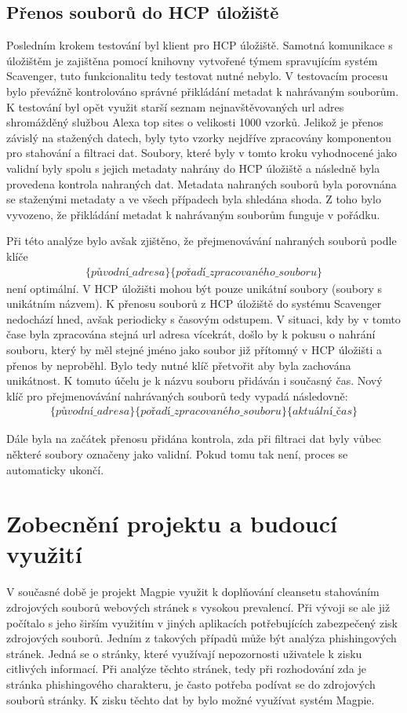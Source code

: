 \documentclass[thesis=M,czech,hidelinks]{FITthesis}[2013/05/06]
\begin{document}
\subsection{Přenos souborů do HCP úložiště}
Posledním krokem testování byl klient pro HCP úložiště. Samotná komunikace s úložištěm je zajištěna pomocí knihovny vytvořené týmem spravujícím systém Scavenger, tuto funkcionalitu tedy testovat nutné nebylo. V testovacím procesu bylo převážně kontrolováno správné přikládání metadat k nahrávaným souborům. K testování byl opět využit starší seznam nejnavštěvovaných url adres shromážděný službou Alexa top sites\cite{alexa} o velikosti 1000 vzorků. Jelikož je přenos závislý na stažených datech, byly tyto vzorky nejdříve zpracovány komponentou pro stahování a filtraci dat. Soubory, které byly v tomto kroku vyhodnocené jako validní byly spolu s jejich metadaty nahrány do HCP úložiště a následně byla provedena kontrola nahraných dat. Metadata nahraných souborů byla porovnána se staženými metadaty a ve všech případech byla shledána shoda. Z toho bylo vyvozeno, že přikládání metadat k nahrávaným souborům funguje v pořádku. 

Při této analýze bylo avšak zjištěno, že přejmenovávání nahraných souborů podle klíče
\begin{eqnarray}\label{prej}
\{původní\_ adresa\}\{pořadí\_ zpracovaného\_ souboru\}
\end{eqnarray}
 není optimální. V HCP úložišti mohou být pouze unikátní soubory (soubory s unikátním názvem). K přenosu souborů z HCP úložiště do systému Scavenger nedochází hned, avšak periodicky s časovým odstupem. V situaci, kdy by v tomto čase byla zpracována stejná url adresa vícekrát, došlo by k pokusu o nahrání souboru, který by měl stejné jméno jako soubor již přítomný v HCP úložišti a přenos by neproběhl. Bylo tedy nutné klíč přetvořit aby byla zachována unikátnost. K tomuto účelu je k názvu souboru přidáván i současný čas. Nový klíč pro přejmenovávání nahrávaných souborů tedy vypadá následovně: 
\begin{eqnarray}\label{prejm}
\{původní\_ adresa\}\{pořadí\_ zpracovaného\_ souboru\}\{aktuální\_čas\}
\end{eqnarray}

Dále byla na začátek přenosu přidána kontrola, zda při filtraci dat byly vůbec některé soubory označeny jako validní. Pokud tomu tak není, proces se automaticky ukončí.

\section{Zobecnění projektu a budoucí využití}
V současné době je projekt Magpie využit k doplňování cleansetu stahováním zdrojových souborů webových stránek s vysokou prevalencí. Při vývoji se ale již počítalo s jeho širším využitím v jiných aplikacích potřebujících zabezpečený zisk zdrojových souborů. Jedním z takových případů může být analýza phishingových stránek. Jedná se o stránky, které využívají nepozornosti uživatele k zisku citlivých informací. Při analýze těchto stránek, tedy při rozhodování zda je stránka phishingového charakteru, je často potřeba podívat se do zdrojových souborů stránky. K zisku těchto dat by bylo možné využívat systém Magpie. 
\end{document}
